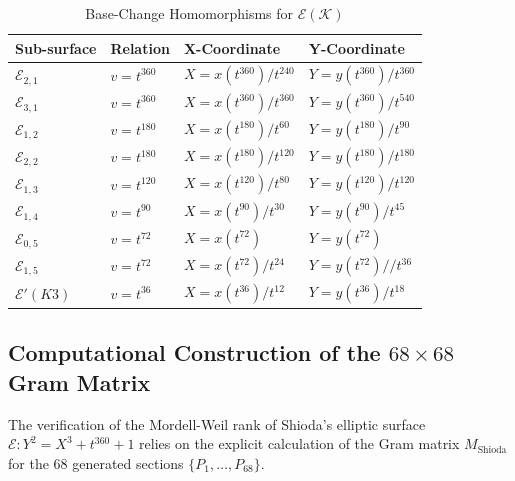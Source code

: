 \documentclass[11pt]{amsart}
\numberwithin{equation}{section}
\numberwithin{table}{section}
\newcommand\<{\langle}
\begin{document}
\begin{table}[htbp]
	\centering
	\caption{Base-Change Homomorphisms for $\mathcal{E}(\mathcal{K})$}
	\label{tab:homomorphisms}
	\begin{tabular}{@{}llll@{}}
		\toprule
		\textbf{Sub-surface} & \textbf{Relation} & \textbf{X-Coordinate} & \textbf{Y-Coordinate} \\ \midrule
		$\mathcal{E}_{2,1}$ & $v = t^{360}$ & $X = x(t^{360})/t^{240}$ & $Y = y(t^{360})/t^{360}$ \\
		$\mathcal{E}_{3,1}$ & $v = t^{360}$ & $X = x(t^{360})/t^{360}$ & $Y = y(t^{360})/t^{540}$ \\
		$\mathcal{E}_{1,2}$ & $v = t^{180}$ & $X = x(t^{180})/t^{60}$ & $Y = y(t^{180})/t^{90}$ \\
		$\mathcal{E}_{2,2}$ & $v = t^{180}$ & $X = x(t^{180})/t^{120}$ & $Y = y(t^{180})/t^{180}$ \\
		$\mathcal{E}_{1,3}$ & $v = t^{120}$ & $X = x(t^{120})/t^{80}$ & $Y = y(t^{120})/t^{120}$ \\
		$\mathcal{E}_{1,4}$ & $v = t^{90}$ & $X = x(t^{90})/t^{30}$ & $Y = y(t^{90})/t^{45}$ \\
		$\mathcal{E}_{0,5}$ & $v = t^{72}$ & $X = x(t^{72})$ & $Y = y(t^{72})$ \\
		$\mathcal{E}_{1,5}$ & $v = t^{72}$ & $X = x(t^{72})/t^{24}$ & $Y = y(t^{72})//t^{36}$ \\
		$\mathcal{E}' (K3)$ & $v = t^{36}$ & $X = x(t^{36})/t^{12}$ & $Y = y(t^{36})/t^{18}$ \\ \bottomrule
	\end{tabular}
	\label{Tab2}
\end{table}




\subsection{Computational Construction of the $68 \times 68$ Gram Matrix}

The verification of the Mordell-Weil rank of Shioda's elliptic surface $\mathcal{E}: Y^2 = X^3 + t^{360} + 1$ relies on the explicit calculation of the Gram matrix $M_{\text{Shioda}}$ for the 68 generated sections $\{P_1, \dots, P_{68}\}$. 
\end{document}

